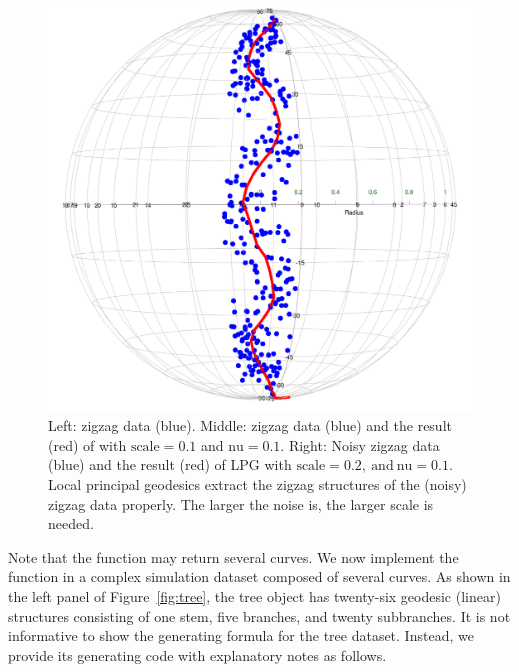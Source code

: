 \begin{figure}[h]
    \includegraphics[scale=0.115]{figures/LPG(zigzag_noisy).png}
    \caption{Left: zigzag data (blue). Middle: zigzag data (blue) and the result (red) of with $\mbox{scale}=0.1$ and $\mbox{nu}=0.1$. Right: Noisy zigzag data (blue) and the result (red) of LPG with $\mbox{scale}=0.2, ~ \mbox{and} ~ \mbox{nu}=0.1$. Local principal geodesics extract the zigzag structures of the (noisy) zigzag data properly. The larger the noise is, the larger scale is needed.}
    \label{fig:zigzag}
\end{figure}

Note that the  function may return several curves. We now implement the function in a complex simulation dataset composed of several curves. As shown in the left panel of Figure~\ref{fig:tree}, the tree object has twenty-six geodesic (linear) structures consisting of one stem, five branches, and twenty subbranches. It is not informative to show the generating formula for the tree dataset. Instead, we provide its generating code with explanatory notes as follows.

